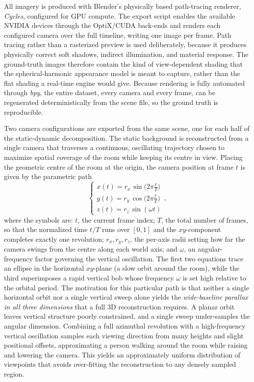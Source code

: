 All imagery is produced with Blender's physically based path-tracing renderer,
\emph{Cycles}, configured for GPU compute. The export script enables the available
NVIDIA devices through the OptiX/CUDA back-ends and renders each configured camera
over the full timeline, writing one image per frame. Path tracing rather than a
rasterized preview is used deliberately, because it produces physically correct soft
shadows, indirect illumination, and material response. The ground-truth images
therefore contain the kind of view-dependent shading that the spherical-harmonic
appearance model is meant to capture, rather than the flat shading a real-time
engine would give. Because rendering is fully automated through \emph{bpy}, the
entire dataset, every camera and every frame, can be regenerated deterministically
from the scene file, so the ground truth is reproducible.

Two camera configurations are exported from the same scene, one for each half of the
static-dynamic decomposition. The static background is reconstructed
from a single camera that traverses a continuous, oscillating trajectory chosen to
maximize spatial coverage of the room while keeping its centre in view. Placing the
geometric centre of the room at the origin, the camera position at frame $t$ is
given by the parametric path
\begin{equation}
    \begin{cases}
        x(t) = r_x \, \sin\!\big(2\pi \tfrac{t}{T}\big) \\
        y(t) = r_y \, \cos\!\big(2\pi \tfrac{t}{T}\big) \\
        z(t) = r_z \, \sin(\omega t)
    \end{cases},
    \label{eq:traj}
\end{equation}
where the symbols are: $t$, the current frame index; $T$, the total number of
frames, so that the normalized time $t/T$ runs over $[0,1]$ and the $xy$-component
completes exactly one revolution; $r_x, r_y, r_z$, the per-axis radii setting how
far the camera swings from the centre along each world axis; and $\omega$, an
angular-frequency factor governing the vertical oscillation. The first two equations
trace an ellipse in the horizontal $xy$-plane (a slow orbit around the room), while
the third superimposes a rapid vertical bob whose frequency $\omega$ is set high
relative to the orbital period. The motivation for this particular path is that
neither a single horizontal orbit nor a single vertical sweep alone yields the
\emph{wide-baseline parallax in all three dimensions} that a full 3D reconstruction
requires. A planar orbit leaves vertical structure poorly constrained, and a single
sweep under-samples the angular dimension. Combining a full azimuthal revolution
with a high-frequency vertical oscillation samples each viewing direction from many
heights and slight positional offsets, approximating a person walking around the
room while raising and lowering the camera. This yields an approximately uniform
distribution of viewpoints that avoids over-fitting the reconstruction to any
densely sampled region.

